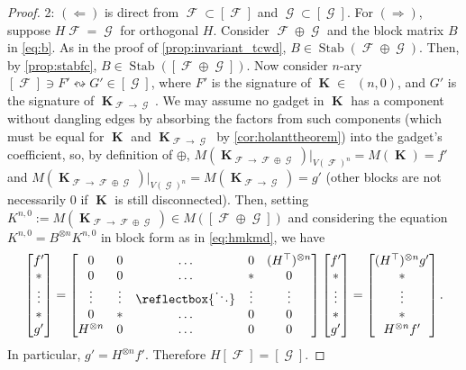 \documentclass{article}
\providecommand{\iddots}{\mathinner{\reflectbox{\ensuremath{\ddots}}}}
\DeclareMathOperator{\vk}{\mathbf{K}}
\DeclareMathOperator{\fc}{\mathcal{F}}
\DeclareMathOperator{\gc}{\mathcal{G}}
\DeclareMathOperator{\qk}{\mathfrak{Q}_{\mathcal{F}}}
\DeclareMathOperator{\stab}{Stab}
\begin{document}
\begin{proof}
    2: $(\Longleftarrow)$ is direct from $\fc \subset [\fc]$ and $\gc \subset [\gc]$. For $(\Longrightarrow)$, suppose
    $H\fc = \gc$ for orthogonal $H$. Consider $\fc \oplus \gc$ and the block matrix 
    $B$ in \eqref{eq:b}. As in the proof of \autoref{prop:invariant_tcwd},
    $B \in \stab(\fc \oplus \gc)$. Then, by \autoref{prop:stabfc}, $B \in 
    \stab([\fc \oplus \gc])$. Now consider $n$-ary 
    $[\fc] \ni F' \leftrightsquigarrow G' \in [\gc]$,
    where $F'$ is the signature of $\vk \in \qk(n,0)$, and $G'$ is the signature of $\vk_{\fc\to\gc}$.
    We may assume no gadget in $\vk$ has a component without dangling edges
    by absorbing the factors from such components (which must be equal for
    $\vk$ and $\vk_{\fc\to\gc}$ by \autoref{cor:holanttheorem}) into the gadget's coefficient,
    so, by definition of $\oplus$, $M(\vk_{\fc\to\fc\oplus\gc})|_{V(\fc)^n} = M(\vk) = f'$ and
    $M(\vk_{\fc\to\fc\oplus\gc})|_{V(\gc)^n} = M(\vk_{\fc\to\gc}) = g'$ (other blocks are not necessarily
    0 if $\vk$ is still disconnected). Then, setting
    $K^{n,0} := M(\vk_{\fc\to\fc\oplus\gc}) \in M([\fc \oplus \gc])$ and considering 
    the equation $K^{n,0} = B^{\otimes n}K^{n,0}$ in block form as in \eqref{eq:hmkmd}, we have
    \[
        \begin{bmatrix} 
            f' \\ * \\ \vdots \\ * \\ g'
        \end{bmatrix} =
        \begin{bmatrix} 
            0 & 0 & \ldots & 0 &(H^\top)^{\otimes n}\\
            0 & 0 & \ldots & * & 0\\
            \vdots & \vdots & \iddots & \vdots & \vdots \\
            0 & * & \ldots & 0 & 0\\
            H^{\otimes n} & 0 & \ldots & 0 & 0
        \end{bmatrix}
        \begin{bmatrix} 
            f' \\ * \\ \vdots \\ * \\ g'
        \end{bmatrix}
        =
        \begin{bmatrix} 
            (H^\top)^{\otimes n} g' \\ * \\ \vdots \\ * \\ H^{\otimes n} f'
        \end{bmatrix}.
    \]
    In particular, $g' = H^{\otimes n}f'$. Therefore $H[\fc] = [\gc]$.
\end{proof}
\end{document}
